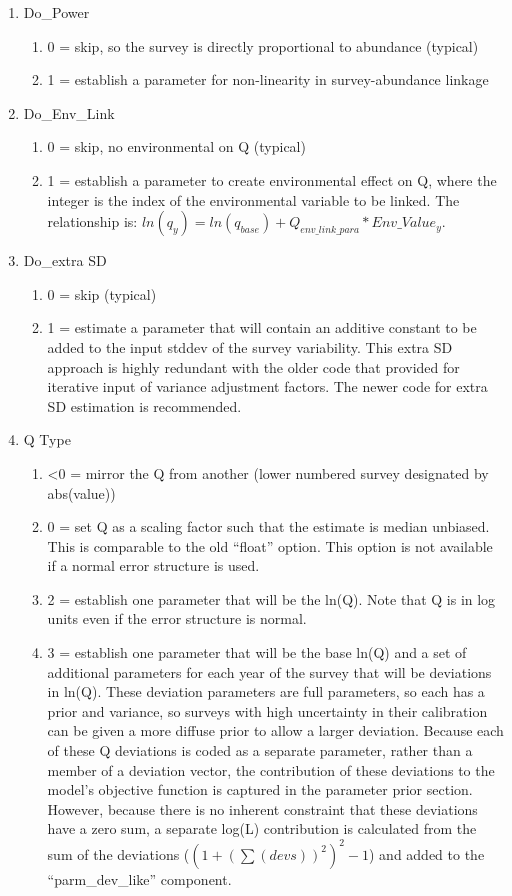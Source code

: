 \begin{enumerate}
	\item Do\_Power
	\begin{enumerate}
		\item 0 = skip, so the survey is directly proportional to abundance (typical)
		\item 1 = establish a parameter for non-linearity in survey-abundance linkage
	\end{enumerate}
	\item Do\_Env\_Link
	\begin{enumerate}
		\item 0 = skip, no environmental on Q (typical)
		\item 1 = establish a parameter to create environmental effect on Q, where the integer is the index of the environmental variable to be linked.  The relationship is:  $ ln(q_y) = ln(q_{base}) + Q_{env\_link\_para}*Env\_Value_y$.
	\end{enumerate}
	\item Do\_extra SD
	\begin{enumerate}
		\item 0 = skip (typical)
		\item 1 = estimate a parameter that will contain an additive constant to be added to the input stddev of the survey variability.  This extra SD approach is highly redundant with the older code that provided for iterative input of variance adjustment factors.  The newer code for extra SD estimation is recommended.
	\end{enumerate}
	\item Q Type
	\begin{enumerate}
		\item <0 = mirror the Q from another (lower numbered survey designated by abs(value))
		\item 0 = set Q as a scaling factor such that the estimate is median unbiased.  This is comparable to the old “float” option.  This option is not available if a normal error structure is used.
		\item 2 = establish one parameter that will be the ln(Q).  Note that Q is in log units even if the error structure is normal.
		\item 3 = establish one parameter that will be the base ln(Q) and a set of additional parameters for each year of the survey that will be deviations in ln(Q).  These deviation parameters are full parameters, so each has a prior and variance, so surveys with high uncertainty in their calibration can be given a more diffuse prior to allow a larger deviation.  Because each of these Q deviations is coded as a separate parameter, rather than a member of a deviation vector, the contribution of these deviations to the model’s objective function is captured in the parameter prior section.  However, because there is no inherent constraint that these deviations have a zero sum, a separate log(L) contribution is calculated from the sum of the deviations ($(1+(\sum(devs))^2)^2-1$) and added to the “parm\_dev\_like” component.

\end{enumerate}
\end{enumerate}
